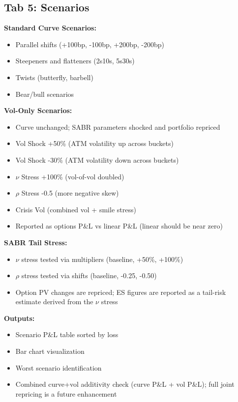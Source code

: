 \documentclass[12pt,a4paper]{report}
\begin{document}
\subsection{Tab 5: Scenarios}

\textbf{Standard Curve Scenarios:}
\begin{itemize}
    \item Parallel shifts (+100bp, -100bp, +200bp, -200bp)
    \item Steepeners and flatteners (2s10s, 5s30s)
    \item Twists (butterfly, barbell)
    \item Bear/bull scenarios
\end{itemize}

\textbf{Vol-Only Scenarios:}
\begin{itemize}
    \item Curve unchanged; SABR parameters shocked and portfolio repriced
    \item Vol Shock +50\% (ATM volatility up across buckets)
    \item Vol Shock -30\% (ATM volatility down across buckets)
    \item $\nu$ Stress +100\% (vol-of-vol doubled)
    \item $\rho$ Stress -0.5 (more negative skew)
    \item Crisis Vol (combined vol + smile stress)
    \item Reported as options P\&L vs linear P\&L (linear should be near zero)
\end{itemize}

\textbf{SABR Tail Stress:}
\begin{itemize}
    \item $\nu$ stress tested via multipliers (baseline, +50\%, +100\%)
    \item $\rho$ stress tested via shifts (baseline, -0.25, -0.50)
    \item Option PV changes are repriced; ES figures are reported as a tail-risk estimate derived from the $\nu$ stress
\end{itemize}

\textbf{Outputs:}
\begin{itemize}
    \item Scenario P\&L table sorted by loss
    \item Bar chart visualization
    \item Worst scenario identification
    \item Combined curve+vol additivity check (curve P\&L + vol P\&L); full joint repricing is a future enhancement
\end{itemize}
\end{document}
